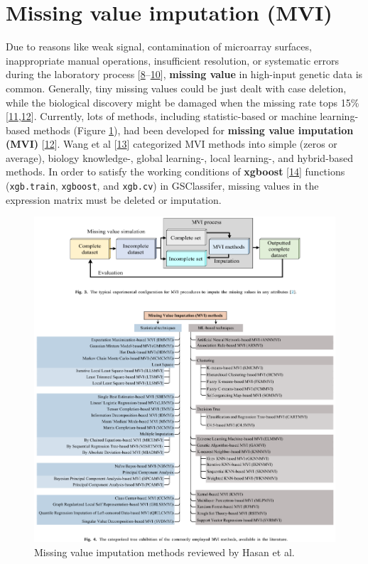 \documentclass[
  12pt,
]{book}
\newcommand{\passthrough}[1]{#1}
\begin{document}
\hypertarget{missing-value-imputation-mvi}{%
\section{Missing value imputation (MVI)}\label{missing-value-imputation-mvi}}

Due to reasons like weak signal, contamination of microarray surfaces, inappropriate manual operations, insufficient resolution, or systematic errors during the laboratory process {[}\protect\hyperlink{ref-RN387}{8}--\protect\hyperlink{ref-RN382}{10}{]}, \textbf{missing value} in high-input genetic data is common. Generally, tiny missing values could be just dealt with case deletion, while the biological discovery might be damaged when the missing rate tops 15\% {[}\protect\hyperlink{ref-RN392}{11},\protect\hyperlink{ref-RN386}{12}{]}. Currently, lots of methods, including statistic-based or machine learning-based methods (Figure \ref{fig:mvi01}), had been developed for \textbf{missing value imputation (MVI)} {[}\protect\hyperlink{ref-RN386}{12}{]}. Wang et al {[}\protect\hyperlink{ref-RN384}{13}{]} categorized MVI methods into simple (zeros or average), biology knowledge-, global learning-, local learning-, and hybrid-based methods. In order to satisfy the working conditions of \textbf{xgboost} {[}\protect\hyperlink{ref-xgboost}{14}{]} functions (\passthrough{\lstinline!xgb.train!}, \passthrough{\lstinline!xgboost!}, and \passthrough{\lstinline!xgb.cv!}) in GSClassifer, missing values in the expression matrix must be deleted or imputation.

\begin{figure}

{\centering \includegraphics[width=0.9\linewidth]{./fig/mvi-01} 

}

\caption{Missing value imputation methods reviewed by Hasan et al.}\label{fig:mvi01}
\end{figure}
\end{document}
